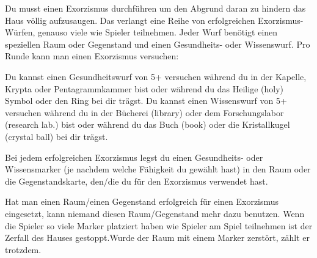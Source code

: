 





Du musst einen Exorzismus durchführen um den Abgrund daran zu hindern das Haus völlig aufzusaugen. Das verlangt eine Reihe von erfolgreichen Exorzismus-Würfen, genauso viele wie Spieler teilnehmen. Jeder Wurf benötigt einen speziellen Raum oder Gegenstand und einen Gesundheits- oder Wissenswurf. Pro Runde kann man einen Exorzismus versuchen:
  \begin{itemize}
        \bitem Du kannst einen Gesundheitswurf von 5+ versuchen während du in der Kapelle, Krypta oder Pentagrammkammer bist oder während du das Heilige (holy) Symbol oder den Ring bei dir trägst.
        \bitem Du kannst einen Wissenswurf von 5+ versuchen während du in der Bücherei (library) oder dem Forschungslabor (research lab.) bist oder während du das Buch (book) oder die Kristallkugel (crystal ball) bei dir trägst.
    \end{itemize}
Bei jedem erfolgreichen Exorzismus legst du einen Gesundheits- oder Wissensmarker (je nachdem welche Fähigkeit du gewählt hast) in den Raum oder die Gegenstandskarte, den/die du für den Exorzismus verwendet hast.

Hat man einen Raum/einen Gegenstand erfolgreich für einen Exorzismus eingesetzt, kann niemand diesen Raum/Gegenstand mehr dazu benutzen. Wenn die Spieler so viele Marker platziert haben wie Spieler am Spiel teilnehmen ist der Zerfall des Hauses gestoppt.Wurde der Raum mit einem Marker zerstört, zählt er trotzdem.



